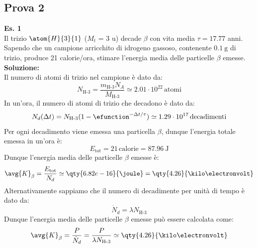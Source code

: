 \subsection{Prova 2}
\textbf{Es. 1}\\
Il trizio $\atom{H}{3}{1}$ ($M_t$ = 3 u) decade $\beta$ con vita media $\tau = 17.77$ anni. Sapendo che un campione arricchito di idrogeno gassoso, contenente $\qty{0.1}{\gram}$ di trizio, produce 21 calorie/ora, stimare l'energia media delle particelle $\beta$ emesse.\\
\textbf{Soluzione:}\\
Il numero di atomi di trizio nel campione è dato da:
\begin{equation}
    N_{\text{H-3}} = \dfrac{m_{\text{H-3}} N_A}{M_{\text{H-3}}} \simeq 2.01 \cdot 10^{22}\,\text{atomi}
\end{equation}
In un'ora, il numero di atomi di trizio che decadono è dato da:
\begin{equation}
    N_d(\Delta t) = N_{\text{H-3}} (1 - \efunction^{-\Delta t/\tau}) \simeq 1.29 \cdot 10^{17}\,\text{decadimenti}
\end{equation}
Per ogni decadimento viene emessa una particella $\beta$, dunque l'energia totale emessa in un'ora è:
\begin{equation}
    E_{\text{tot}} = 21\,\text{calorie} = \qty{87.96}{\joule}
\end{equation}
Dunque l'energia media delle particelle $\beta$ emesse è:
\begin{equation}
    \avg{K}_\beta = \dfrac{E_{\text{tot}}}{N_d} \simeq \qty{6.82e-16}{\joule} = \qty{4.26}{\kilo\electronvolt}
\end{equation}
Alternativamente sappiamo che il numero di decadimente per unità di tempo è dato da:
\begin{equation}
    \dot{N}_d = \lambda N_{\text{H-3}}
\end{equation}
Dunque l'energia media delle particelle $\beta$ emesse può essere calcolata come:
\begin{equation}
    \avg{K}_\beta = \dfrac{P}{\dot{N}_d} = \dfrac{P}{\lambda N_{\text{H-3}}} \simeq \qty{4.26}{\kilo\electronvolt}
\end{equation}
